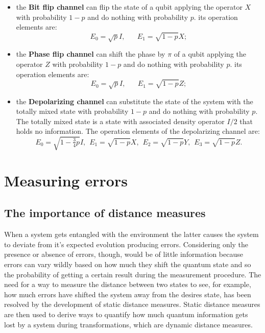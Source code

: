 \documentclass{article}
\begin{document}
\begin{itemize}

	\item the \textbf{Bit flip channel} can flip the state of a qubit applying
	      the operator $X$ with probability $1-p$ and do nothing with
	      probability $p$.
	      its operation elements are:
	      \begin{equation}
		      E_0 = \sqrt{p}I, \hspace{20pt} E_1 = \sqrt{1-p}X;
	      \end{equation}

	\item the \textbf{Phase flip channel} can shift the phase by $\pi$ of a qubit applying
	      the operator $Z$ with probability $1-p$ and do nothing with
	      probability $p$.
	      its operation elements are:
	      \begin{equation}
		      E_0 = \sqrt{p}I, \hspace{20pt} E_1 = \sqrt{1-p}Z;
	      \end{equation}

	\item the \textbf{Depolarizing channel} can substitute the state of the system with the
	      totally mixed state with probability $1-p$ and do nothing with
	      probability $p$.
	      The totally mixed state is a state with associated density operator $I/2$
	      that holds no information.
	      The operation elements of the depolarizing channel are:
	      \begin{equation}
		      E_0 = \sqrt{1-\tfrac{3}{4}p}I, \hspace{5pt} E_1 = \sqrt{1-p}X , \hspace{5pt}
		      E_2 = \sqrt{1-p}Y , \hspace{5pt} E_3 = \sqrt{1-p}Z.
	      \end{equation}


\end{itemize}

\section{Measuring errors}

\subsection{The importance of distance measures}

When a system gets entangled with the environment the latter causes the system
to deviate from it's expected evolution producing errors.
Considering only the presence or absence of errors, though, would be of little
information because errors can vary wildly based on how much they shift the
quantum state and so the probability of getting a certain result during
the measurement procedure.
The need for a way to measure the distance between two states to see, for example,
how much errors have shifted the system away from the desires state, has been resolved
by the development of static distance measures.
Static distance measures are then used to derive ways to quantify how much quantum
information gets lost by a system during transformations, which are dynamic distance
measures.
\end{document}

